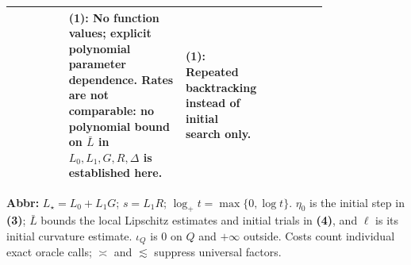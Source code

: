 \begin{table}[tp]
\begin{threeparttable}
\begin{tabularx}{\linewidth}{@{}>{\raggedright\arraybackslash}p{0.18\linewidth}>{\raggedright\arraybackslash}p{0.37\linewidth}>{\raggedright\arraybackslash}p{0.24\linewidth}>{\raggedright\arraybackslash}X@{}}
& \textbf{(1)}: No function values; explicit polynomial parameter dependence. Rates are not comparable: no polynomial bound on $\bar L$ in $L_0,L_1,G,R,\Delta$ is established here.
& \textbf{(1)}: Repeated backtracking instead of initial search only. \\
\bottomrule
\end{tabularx}
\begin{tablenotes}[flushleft]\footnotesize
\item[] \textbf{Abbr:} $L_\star=L_0+L_1G$; $s=L_1R$; $\log_+t=\max\{0,\log t\}$. $\eta_0$ is the initial step in \textbf{(3)}; $\bar L$ bounds the local Lipschitz estimates and initial trials in \textbf{(4)}, and $\ell$ is its initial curvature estimate. $\iota_Q$ is $0$ on $Q$ and $+\infty$ outside. Costs count individual exact oracle calls; $\asymp$ and $\lesssim$ suppress universal factors.
\end{tablenotes}
\end{threeparttable}
\end{table}
\clearpage
